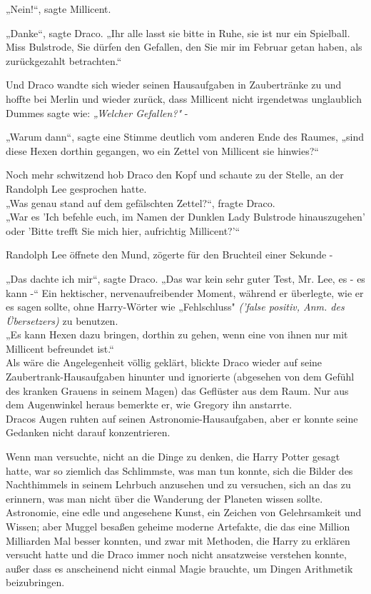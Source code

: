 {„Nein!“, sagte Millicent.

„Danke“, sagte Draco. „Ihr alle lasst sie bitte in Ruhe, sie ist nur ein Spielball. Miss Bulstrode, Sie dürfen den Gefallen, den Sie mir im Februar getan haben, als zurückgezahlt betrachten.“

Und Draco wandte sich wieder seinen Hausaufgaben in Zaubertränke zu und hoffte bei Merlin und wieder zurück, dass Millicent nicht irgendetwas unglaublich Dummes sagte wie: \emph{„Welcher Gefallen?"} -

„Warum dann“, sagte eine Stimme deutlich vom anderen Ende des Raumes, „sind diese Hexen dorthin gegangen, wo ein Zettel von Millicent sie hinwies?“

Noch mehr schwitzend hob Draco den Kopf und schaute zu der Stelle, an der Randolph Lee gesprochen hatte.\\ „Was genau stand auf dem gefälschten Zettel?“, fragte Draco.\\ „War es 'Ich befehle euch, im Namen der Dunklen Lady Bulstrode hinauszugehen' oder 'Bitte trefft Sie mich hier, aufrichtig Millicent?'“

Randolph Lee öffnete den Mund, zögerte für den Bruchteil einer Sekunde -

„Das dachte ich mir“, sagte Draco. „Das war kein sehr guter Test, Mr. Lee, es - es kann -“ Ein hektischer, nervenaufreibender Moment, während er überlegte, wie er es sagen sollte, ohne Harry-Wörter wie „Fehlschluss" \emph{('false positiv, Anm. des Übersetzers)} zu benutzen.\\ „Es kann Hexen dazu bringen, dorthin zu gehen, wenn eine von ihnen nur mit Millicent befreundet ist.“\\ Als wäre die Angelegenheit völlig geklärt, blickte Draco wieder auf seine Zaubertrank-Hausaufgaben hinunter und ignorierte (abgesehen von dem Gefühl des kranken Grauens in seinem Magen) das Geflüster aus dem Raum. Nur aus dem Augenwinkel heraus bemerkte er, wie Gregory ihn anstarrte.\\ Dracos Augen ruhten auf seinen Astronomie-Hausaufgaben, aber er konnte seine Gedanken nicht darauf konzentrieren.

Wenn man versuchte, nicht an die Dinge zu denken, die Harry Potter gesagt hatte, war so ziemlich das Schlimmste, was man tun konnte, sich die Bilder des Nachthimmels in seinem Lehrbuch anzusehen und zu versuchen, sich an das zu erinnern, was man nicht über die Wanderung der Planeten wissen sollte. Astronomie, eine edle und angesehene Kunst, ein Zeichen von Gelehrsamkeit und Wissen; aber Muggel besaßen geheime moderne Artefakte, die das eine Million Milliarden Mal besser konnten, und zwar mit Methoden, die Harry zu erklären versucht hatte und die Draco immer noch nicht ansatzweise verstehen konnte, außer dass es anscheinend nicht einmal Magie brauchte, um Dingen Arithmetik beizubringen.

}
